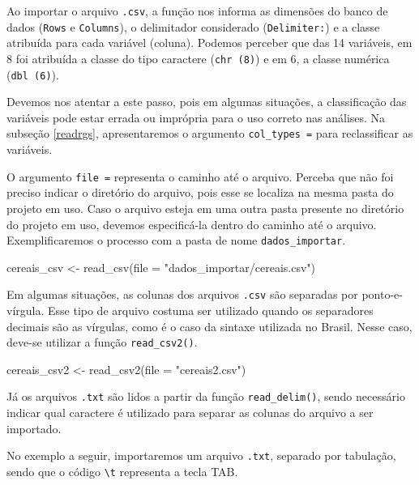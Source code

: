 \documentclass[
  brazilian,
]{book}
\newenvironment{Shaded}{\begin{snugshade}}{\end{snugshade}}
\newcommand{\AttributeTok}[1]{\textcolor[rgb]{0.77,0.63,0.00}{#1}}
\newcommand{\FunctionTok}[1]{\textcolor[rgb]{0.00,0.00,0.00}{#1}}
\newcommand{\NormalTok}[1]{#1}
\newcommand{\OtherTok}[1]{\textcolor[rgb]{0.56,0.35,0.01}{#1}}
\newcommand{\StringTok}[1]{\textcolor[rgb]{0.31,0.60,0.02}{#1}}
\begin{document}
Ao importar o arquivo \texttt{.csv}, a função nos informa as dimensões do banco de dados (\texttt{Rows} e \texttt{Columns}), o delimitador considerado (\texttt{Delimiter:}) e a classe atribuída para cada variável (coluna). Podemos perceber que das 14 variáveis, em 8 foi atribuída a classe do tipo caractere (\texttt{chr\ (8)}) e em 6, a classe numérica (\texttt{dbl\ (6)}).

Devemos nos atentar a este passo, pois em algumas situações, a classificação das variáveis pode estar errada ou imprópria para o uso correto nas análises. Na subseção \ref{readrgs}, apresentaremos o argumento \texttt{col\_types\ =} para reclassificar as variáveis.

O argumento \texttt{file\ =} representa o caminho até o arquivo. Perceba que não foi preciso indicar o diretório do arquivo, pois esse se localiza na mesma pasta do projeto em uso. Caso o arquivo esteja em uma outra pasta presente no diretório do projeto em uso, devemos especificá-la dentro do caminho até o arquivo. Exemplificaremos o processo com a pasta de nome \texttt{dados\_importar}.

\begin{Shaded}
\begin{Highlighting}[]
\NormalTok{cereais\_csv }\OtherTok{\textless{}{-}} \FunctionTok{read\_csv}\NormalTok{(}\AttributeTok{file =} \StringTok{"dados\_importar/cereais.csv"}\NormalTok{)}
\end{Highlighting}
\end{Shaded}

Em algumas situações, as colunas dos arquivos \texttt{.csv} são separadas por ponto-e-vírgula. Esse tipo de arquivo costuma ser utilizado quando os separadores decimais são as vírgulas, como é o caso da sintaxe utilizada no Brasil. Nesse caso, deve-se utilizar a função \texttt{read\_csv2()}.

\begin{Shaded}
\begin{Highlighting}[]
\NormalTok{cereais\_csv2 }\OtherTok{\textless{}{-}} \FunctionTok{read\_csv2}\NormalTok{(}\AttributeTok{file =} \StringTok{"cereais2.csv"}\NormalTok{)}
\end{Highlighting}
\end{Shaded}

Já os arquivos \texttt{.txt} são lidos a partir da função \texttt{read\_delim()}, sendo necessário indicar qual caractere é utilizado para separar as colunas do arquivo a ser importado.

No exemplo a seguir, importaremos um arquivo \texttt{.txt}, separado por tabulação, sendo que o código \texttt{\textbackslash{}t} representa a tecla TAB.
\end{document}
